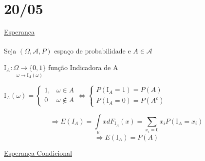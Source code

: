 \documentclass[a4paper,12pt]{article}
\begin{document}
\newpage

\section*{20/05}

\underline{Esperança}\\
\\
Seja $(\Omega,\mathscr{A},P)$ espaço de probabilidade e $A\in \mathscr A$

$\mathrm{I}_A : \underset{\omega \longrightarrow \mathrm I_A(\omega)}{\Omega \longrightarrow\{0,1\}} $ função Indicadora de A

$\mathrm I_A(\omega) = \begin{cases}
1, & \omega \in A\\
0 & \omega \not\in A
\end{cases}
\Leftrightarrow \begin{cases}
P(\mathrm I_A =1) = P(A)\\
P(\mathrm I_A=0) = P(A^c)
\end{cases}
$

$$\Rightarrow E(I_A)= \int\limits_{\mathbb R} x dF_{\mathrm I_A}(x)= \sum\limits_{x_i=0} x_i P(\mathrm{I}_A=x_i) $$
$$\Rightarrow E(\mathrm I_A)=P(A) $$

\underline{Esperança Condicional}
\end{document}
